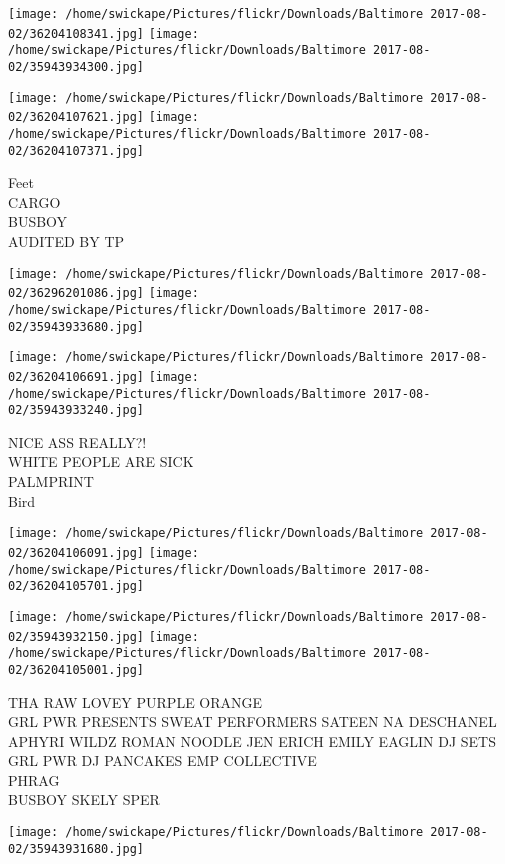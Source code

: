 \documentclass[10pt,letterpaper]{article}
\begin{document}
\texttt{[image: /home/swickape/Pictures/flickr/Downloads/Baltimore 2017-08-02/36204108341.jpg]}
\texttt{[image: /home/swickape/Pictures/flickr/Downloads/Baltimore 2017-08-02/35943934300.jpg]}

\texttt{[image: /home/swickape/Pictures/flickr/Downloads/Baltimore 2017-08-02/36204107621.jpg]}
\texttt{[image: /home/swickape/Pictures/flickr/Downloads/Baltimore 2017-08-02/36204107371.jpg]}

Feet\\
CARGO\\
BUSBOY\\
AUDITED BY TP\\
\pagebreak

\texttt{[image: /home/swickape/Pictures/flickr/Downloads/Baltimore 2017-08-02/36296201086.jpg]}
\texttt{[image: /home/swickape/Pictures/flickr/Downloads/Baltimore 2017-08-02/35943933680.jpg]}

\texttt{[image: /home/swickape/Pictures/flickr/Downloads/Baltimore 2017-08-02/36204106691.jpg]}
\texttt{[image: /home/swickape/Pictures/flickr/Downloads/Baltimore 2017-08-02/35943933240.jpg]}

NICE ASS REALLY?!\\
WHITE PEOPLE ARE SICK\\
PALMPRINT\\
Bird\\
\pagebreak

\texttt{[image: /home/swickape/Pictures/flickr/Downloads/Baltimore 2017-08-02/36204106091.jpg]}
\texttt{[image: /home/swickape/Pictures/flickr/Downloads/Baltimore 2017-08-02/36204105701.jpg]}

\texttt{[image: /home/swickape/Pictures/flickr/Downloads/Baltimore 2017-08-02/35943932150.jpg]}
\texttt{[image: /home/swickape/Pictures/flickr/Downloads/Baltimore 2017-08-02/36204105001.jpg]}

THA RAW LOVEY PURPLE ORANGE\\
GRL PWR PRESENTS SWEAT PERFORMERS SATEEN  NA DESCHANEL APHYRI WILDZ ROMAN NOODLE JEN ERICH EMILY EAGLIN DJ SETS GRL PWR DJ PANCAKES EMP COLLECTIVE\\
PHRAG\\
BUSBOY SKELY SPER\\
\pagebreak

\texttt{[image: /home/swickape/Pictures/flickr/Downloads/Baltimore 2017-08-02/35943931680.jpg]}
\end{document}
